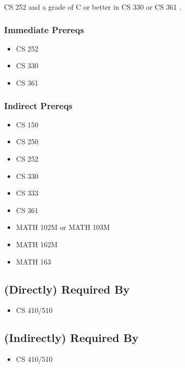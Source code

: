 \documentclass[]{article}
\providecommand{\tightlist}{%
  \setlength{\itemsep}{0pt}\setlength{\parskip}{0pt}}
\begin{document}
CS 252 and a grade of C or better in CS 330 or CS 361 .

\subsubsection{Immediate Prereqs}\label{immediate-prereqs-12}

\begin{itemize}
\tightlist
\item
  CS 252
\item
  CS 330
\item
  CS 361
\end{itemize}

\subsubsection{Indirect Prereqs}\label{indirect-prereqs-12}

\begin{itemize}
\tightlist
\item
  CS 150
\item
  CS 250
\item
  CS 252
\item
  CS 330
\item
  CS 333
\item
  CS 361
\item
  MATH 102M or MATH 103M
\item
  MATH 162M
\item
  MATH 163
\end{itemize}

\subsection{(Directly) Required By}\label{directly-required-by-9}

\begin{itemize}
\tightlist
\item
  CS 410/510
\end{itemize}

\subsection{(Indirectly) Required By}\label{indirectly-required-by-9}

\begin{itemize}
\tightlist
\item
  CS 410/510
\end{itemize}
\end{document}
